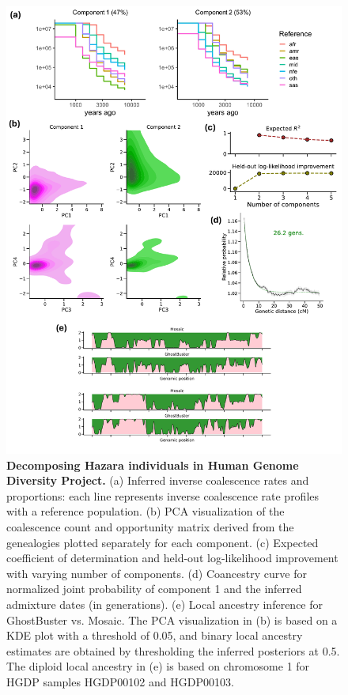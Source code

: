 \begin{figure}[h!]
    \centering
    \includegraphics[width=\linewidth]{figures/gb_sims/gb_real_hazara.pdf}
    \captionsetup{width=\textwidth+3cm}     \caption{
    \footnotesize
    \textbf{Decomposing Hazara individuals in Human Genome Diversity Project.} (a) Inferred inverse coalescence rates and proportions: each line represents inverse coalescence rate profiles with a reference population. (b) PCA visualization of the coalescence count and opportunity matrix derived from the genealogies plotted separately for each component. (c) Expected coefficient of determination and held-out log-likelihood improvement with varying number of components. (d) Coancestry curve for normalized joint probability of component 1 and the inferred admixture dates (in generations). (e) Local ancestry inference for GhostBuster vs. Mosaic. The PCA visualization in (b) is based on a KDE plot with a threshold of 0.05, and binary local ancestry estimates are obtained by thresholding the inferred posteriors at 0.5. The diploid local ancestry in (e) is based on chromosome 1 for HGDP samples HGDP00102 and HGDP00103.
    }
    \label{fig:gb_hazara}
\end{figure}

